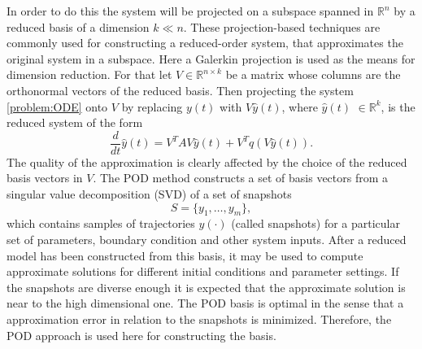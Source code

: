 In order to do  this the system will be projected on a subspace spanned in $\mathbb{R}^n$ by a reduced basis of a dimension $k \ll n$.
These projection-based techniques are commonly used for constructing a reduced-order system, that approximates the
original system in a subspace. Here a Galerkin projection is used as the means for dimension reduction.
For that let $V \in \mathbb{R}^{n \times k}$ be a matrix whose columns are the orthonormal vectors of the reduced
basis. Then projecting the system \eqref{problem:ODE} onto $V$ by replacing $y(t)$ with $V\hat{y}(t)$, where $\hat{y}(t)$ 
$\in \mathbb{R}^k$, is the reduced system of the form
\begin{equation}\label{Chapter2:problem_pod}
  \frac{d}{dt}\hat{y}(t) = V^TAV\hat{y}(t) + V^Tq(V\hat{y}(t)).
\end{equation}
The quality of the approximation is clearly affected by the choice of the reduced basis vectors in $V$. The POD method constructs a set of basis
vectors from a singular value decomposition (SVD) of a set of snapshots
\begin{equation}
 S = \{y_1,\dots,y_m\},
\end{equation}
which contains samples of trajectories $y(\cdot)$ (called snapshots) for a particular set of parameters, boundary condition and other system inputs. 
After a reduced model has
been constructed from this basis, it may be used to compute approximate solutions for different initial conditions
and parameter settings. If the snapshots are diverse enough it is expected that the approximate solution is near to the high dimensional one.
The POD basis is optimal in the sense that a approximation error in relation to the snapshots is minimized. 
Therefore, the POD approach is used here for constructing the basis.

